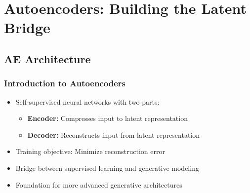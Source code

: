 \documentclass[5pt,aspectratio=169]{beamer}
\begin{document}
\section{Autoencoders: Building the Latent Bridge}
\subsection{AE Architecture}
\begin{frame}
\frametitle{Introduction to Autoencoders}
\begin{itemize}
    \item Self-supervised neural networks with two parts:
    \begin{itemize}
        \item \textbf{Encoder:} Compresses input to latent representation
        \item \textbf{Decoder:} Reconstructs input from latent representation
    \end{itemize}
    \item Training objective: Minimize reconstruction error
    \item Bridge between supervised learning and generative modeling
    \item Foundation for more advanced generative architectures
\end{itemize}
\end{frame}
\end{document}
